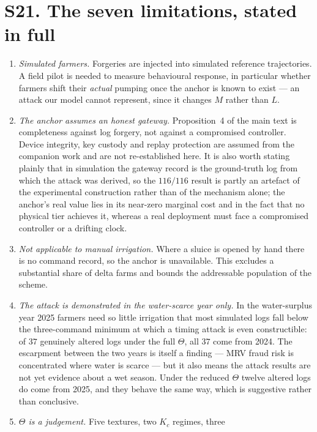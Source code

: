 \section*{S21. The seven limitations, stated in full}

\begin{enumerate}
\item \emph{Simulated farmers.} Forgeries are injected into simulated reference
trajectories. A field pilot is needed to measure behavioural response, in
particular whether farmers shift their \emph{actual} pumping once the anchor is
known to exist --- an attack our model cannot represent, since it changes $M$
rather than $L$.
\item \emph{The anchor assumes an honest gateway.}
Proposition~4 of the main text is completeness against log forgery, not against
a compromised controller. Device integrity, key custody and replay protection
are assumed from the companion work and are not re-established here. It is also
worth stating plainly that in simulation the gateway record is the ground-truth
log from which the attack was derived, so the $116/116$ result is partly an
artefact of the experimental construction rather than of the mechanism alone;
the anchor's real value lies in its near-zero marginal cost and in the fact that
no physical tier achieves it, whereas a real deployment must face a compromised
controller or a drifting clock.
\item \emph{Not applicable to manual irrigation.} Where a sluice is opened by
hand there is no command record, so the anchor is unavailable. This excludes a
substantial share of delta farms and bounds the addressable population of the
scheme.
\item \emph{The attack is demonstrated in the water-scarce year only.} In the
water-surplus year 2025 farmers need so little irrigation that most simulated
logs fall below the three-command minimum at which a timing attack is even
constructible: of $37$ genuinely altered logs under the full $\Theta$, all $37$
come from 2024. The escarpment between the two years is itself a finding --- MRV
fraud risk is concentrated where water is scarce --- but it also means the
attack results are not yet evidence about a wet season. Under the reduced
$\Theta$ twelve altered logs do come from 2025, and they behave the same way,
which is suggestive rather than conclusive.
\item \emph{$\Theta$ is a judgement.} Five textures, two $K_c$ regimes, three

\end{enumerate}
